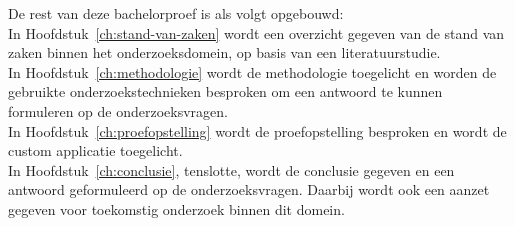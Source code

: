 
De rest van deze bachelorproef is als volgt opgebouwd:\\

In Hoofdstuk~\ref{ch:stand-van-zaken} wordt een overzicht gegeven van de stand van zaken binnen het onderzoeksdomein, op basis van een literatuurstudie.\\

In Hoofdstuk~\ref{ch:methodologie} wordt de methodologie toegelicht en worden de gebruikte onderzoekstechnieken besproken om een antwoord te kunnen formuleren op de onderzoeksvragen.\\

In Hoofdstuk~\ref{ch:proefopstelling} wordt de proefopstelling besproken en wordt de custom applicatie toegelicht.\\

In Hoofdstuk~\ref{ch:conclusie}, tenslotte, wordt de conclusie gegeven en een antwoord geformuleerd op de onderzoeksvragen. Daarbij wordt ook een aanzet gegeven voor toekomstig onderzoek binnen dit domein.